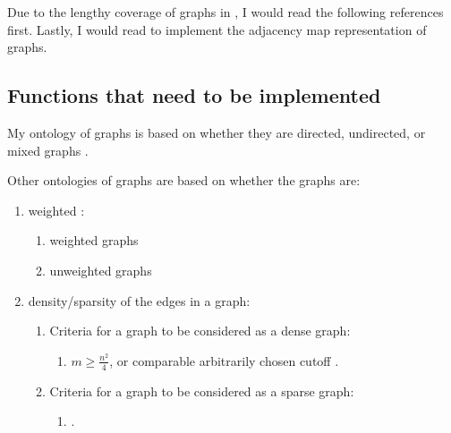 Due to the lengthy coverage of graphs in \cite[\S52-\S57]{Goldman2008}, I would read the following references \cite{Cormen2009,Cormen2013,Goodrich2011} first. Lastly, I would read \cite{Goodrich2013} to implement the adjacency map representation of graphs.


















\subsection{Functions that need to be implemented}
\label{ssec:FunctionsThatNeedToBeImplemented}


My ontology of graphs is based on whether they are directed, undirected, or mixed graphs \cite{WikipediaContributors2018a50}.

Other ontologies of graphs are based on whether the graphs are: \vspace{-0.3cm}
\begin{enumerate} \itemsep -4pt
\item weighted \cite{WikipediaContributors2018a38,Goldman2008}: \vspace{-0.3cm}
	\begin{enumerate} \itemsep -2pt
	\item weighted graphs \cite[\S52, pp. 843; \S51, pp. 842]{Goldman2008}
	\item unweighted graphs \cite[\S52, pp. 843; \S51, pp. 842]{Goldman2008}
	\end{enumerate}
\item density/sparsity of the edges in a graph: \vspace{-0.3cm}
	\begin{enumerate} \itemsep -2pt
	\item Criteria for a graph to be considered as a dense graph: \vspace{-0.2cm}
		\begin{enumerate} \itemsep -2pt
		\item $m \geq \frac{n^{2}}{4}$, or comparable arbitrarily chosen cutoff \cite[\S52.2, pp. 848; \S55, pp. 901]{Goldman2008}.
		\end{enumerate}
	\item Criteria for a graph to be considered as a sparse graph: \vspace{-0.2cm}
		\begin{enumerate} \itemsep -2pt
		\item  \cite[\S52.2, pp. 848]{Goldman2008}.
		\end{enumerate}
	\end{enumerate}
\end{enumerate}

